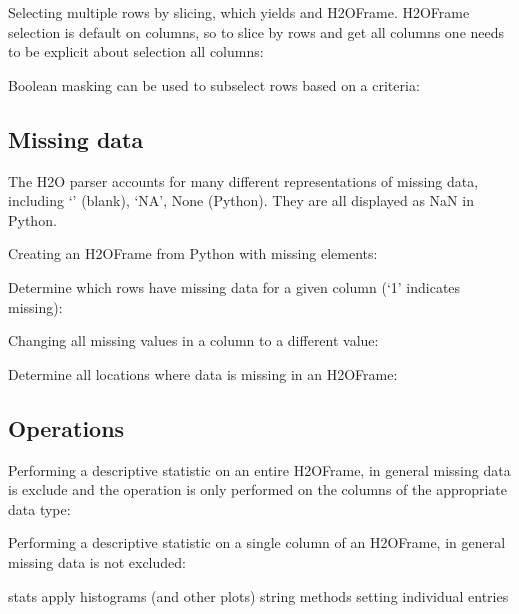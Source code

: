 \waterExampleInPython
Selecting multiple rows by slicing, which yields and H2OFrame.
H2OFrame selection is default on columns, so to slice by rows
and get all columns one needs to be explicit about selection all columns:


\waterExampleInPython
Boolean masking can be used to subselect rows based on a criteria:



\subsection{Missing data}
The H2O parser accounts for many different representations of missing data, including `' (blank),
`NA', None (Python).  They are all displayed as NaN in Python.

\waterExampleInPython
Creating an H2OFrame from Python with missing elements:


\waterExampleInPython
Determine which rows have missing data for a given column (`1' indicates missing):


\waterExampleInPython
Changing all missing values in a column to a different value:


\waterExampleInPython
Determine all locations where data is missing in an H2OFrame:


\subsection{Operations}
\waterExampleInPython
Performing a descriptive statistic on an entire H2OFrame, in general missing data is exclude
and the operation is only performed on the columns of the appropriate data type:


\waterExampleInPython
Performing a descriptive statistic on a single column of an H2OFrame, in general missing data is
not excluded:


stats
apply
histograms (and other plots)
string methods
setting individual entries


